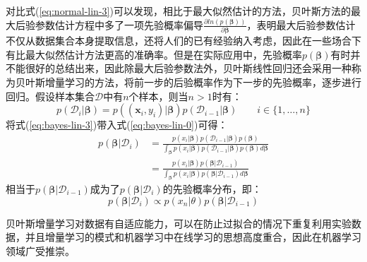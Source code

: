 \documentclass[a4paper]{ctexart}
\begin{document}
\begin{spacing}{1.3}
	对比式(\ref{eq:normal-lin-3})可以发现，相比于最大似然估计的方法，贝叶斯方法的最大后验参数估计方程中多了一项先验概率偏导$\frac{\partial ln(p(\bm\beta))}{\partial\bm\beta}$，表明最大后验参数估计不仅从数据集合本身提取信息，还将人们的已有经验纳入考虑，因此在一些场合下有比最大似然估计方法更高的准确率。但是在实际应用中，先验概率$p(\bm\beta)$有时并不能很好的总结出来，因此除最大后验参数法外，贝叶斯线性回归还会采用一种称为贝叶斯增量学习\cite{RN96}的方法，将前一步的后验概率作为下一步的先验概率，逐步进行回归。假设样本集合$\mathcal{D}$中有$n$个样本，则当$n>1$时有：
	\begin{equation}\label{eq:bayes-lin-3}
	p(\mathcal{D}_i|\bm\beta) = p((\bm x_i,y_i)|\bm\beta)p(\mathcal{D}_{i-1}|\bm\beta)\qquad i\in\{1,\dots,n\}
	\end{equation}
	将式(\ref{eq:bayes-lin-3})带入式(\ref{eq:bayes-lin-0})可得：
	\begin{equation}
	\begin{split}p(\bm\beta|\mathcal{D}_i)&= \frac{p(x_i|\bm\beta)p(\mathcal{D}_{i-1}|\bm\beta)p(\bm\beta)}{\int_{\bm\beta} p(x_i|\bm\beta)p(\mathcal{D}_{i-1}|\bm\beta)p(\bm\beta)d\bm\beta}\\
	&=\frac {p(x_i|\bm\beta)p(\bm\beta|\mathcal{D}_{i-1})}{\int_{\bm\beta} p(x_i|\bm\beta)p(\bm\beta|\mathcal{D}_{i-1})d\bm\beta}
	\end{split}
	\end{equation}
	相当于$p(\bm\beta|\mathcal{D}_{i-1})$成为了$p(\bm\beta|\mathcal{D}_i)$的先验概率分布，即：
	\begin{equation}
	p(\bm\beta|\mathcal{D}_i)\propto p(x_n|\theta)p(\bm\beta|\mathcal{D}_{i-1})
	\end{equation}
	
	贝叶斯增量学习对数据有自适应能力，可以在防止过拟合的情况下重复利用实验数据，并且增量学习的模式和机器学习中在线学习的思想高度重合，因此在机器学习领域广受推崇。
	
	

\end{spacing}
\end{document}
